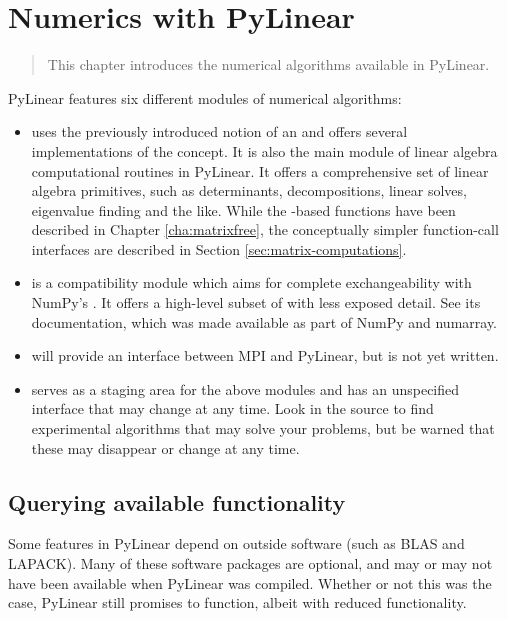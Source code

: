\chapter{Numerics with PyLinear}
\label{cha:numerics}

\begin{quote}
   This chapter introduces the numerical algorithms available
   in PyLinear.
\end{quote}

PyLinear features six different modules of numerical algorithms:
\begin{itemize}
  \item {} uses the previously introduced 
    notion of an  and offers several implementations 
    of the concept. It is also the main module of linear
    algebra computational routines in PyLinear. It offers a
    comprehensive set of linear algebra primitives, such as
    determinants, decompositions, linear solves, eigenvalue finding
    and the like. While the -based functions have
    been described in Chapter \ref{cha:matrixfree}, the conceptually
    simpler function-call interfaces are described in Section
    \ref{sec:matrix-computations}.
  \item {} is a compatibility module 
    which aims for complete exchangeability with NumPy's .
    It offers a high-level subset of  
    with less exposed detail. See its documentation, which was made
    available as part of NumPy and numarray.
  \item {} will provide an interface between
   MPI and PyLinear, but is not yet written.
  \item {} serves as a staging area for
    the above modules and has an unspecified interface that may 
    change at any time. Look in the source to find experimental
    algorithms that may solve your problems, but be warned that
    these may disappear or change at any time.
\end{itemize}

\section{Querying available functionality}
\label{sec:querying-functionality}

Some features in PyLinear depend on outside software (such as BLAS and LAPACK).
Many of these software packages are optional, and may or may not have been
available when PyLinear was compiled. Whether or not this was the case,
PyLinear still promises to function, albeit with reduced functionality.

